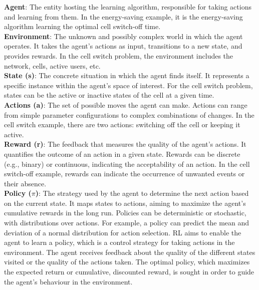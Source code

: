\textbf{Agent}: The entity hosting the learning algorithm, responsible for taking actions and learning from them. In the energy-saving example, it is the energy-saving algorithm learning the optimal cell switch-off time.\\

\textbf{Environment}: The unknown and possibly complex world in which the agent operates. It takes the agent's actions as input, transitions to a new state, and provides rewards. In the cell switch problem, the environment includes the network, cells, active users, etc.\\

\textbf{State (s)}: The concrete situation in which the agent finds itself. It represents a specific instance within the agent's space of interest. For the cell switch problem, states can be the active or inactive states of the cell at a given time.\\

\textbf{Actions (a)}: The set of possible moves the agent can make. Actions can range from simple parameter configurations to complex combinations of changes. In the cell switch example, there are two actions: switching off the cell or keeping it active.\\

\textbf{Reward (r)}: The feedback that measures the quality of the agent's actions. It quantifies the outcome of an action in a given state. Rewards can be discrete (e.g., binary) or continuous, indicating the acceptability of an action. In the cell switch-off example, rewards can indicate the occurrence of unwanted events or their absence.\\

\textbf{Policy ($\pi$)}: The strategy used by the agent to determine the next action based on the current state. It maps states to actions, aiming to maximize the agent's cumulative rewards in the long run. Policies can be deterministic or stochastic, with distributions over actions. For example, a policy can predict the mean and deviation of a normal distribution for action selection.
RL aims to enable the agent to learn a policy, which is a control strategy for taking actions in the environment. The agent receives feedback about the quality of the different states visited or the quality of the actions taken. The optimal policy, which maximizes the expected return or cumulative, discounted reward, is sought in order to guide the agent's behaviour in the environment.\\

